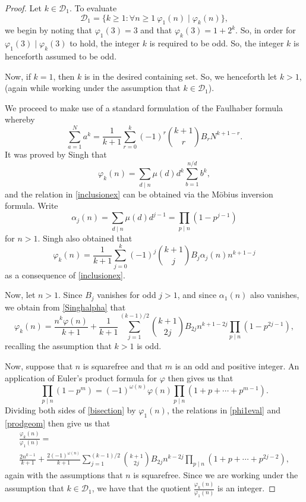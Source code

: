 \documentclass[12pt]{article}
\begin{document}
\begin{proof}
 Let $k \in \mathcal{D}_{1}$. 
 To evaluate
 $$ \mathcal{D}_{1} = \{ k \geq 1 : \forall n \geq 1 \ \varphi_{1}(n) \mid \varphi_k(n) \}, $$ 
 we begin by noting that $\varphi_1(3) = 3$ and that $\varphi_k(3) = 1 + 2^k$. 
 So, in order for $\varphi_1(3) \mid \varphi_k(3)$ to hold, the integer $k$ is required to be odd. 
 So, the integer $k$ is henceforth assumed to be odd. 

 Now, if $k = 1$, then $k$ is in the desired containing set. So, we henceforth let $k > 1$, 
 (again while working under the assumption that $k \in \mathcal{D}_{1}$). 

 We proceed to make use of a standard formulation of the Faulhaber formula whereby 
 $$ \sum_{a=1}^{N} a^{k}
 = \frac{1}{k+1} \sum_{r=0}^{k} (-1)^{r} \binom{k+1}{r} B_{r} N^{k+1-r}. $$
 It was proved by Singh \cite[Theorem 3]{Singh2009} that 
\begin{equation}\label{inclusionex} 
 \varphi_{k}(n) = \sum_{d \mid n} \mu(d) d^{k} \sum_{b=1}^{n/d} b^k, 
\end{equation}
 and the relation in \eqref{inclusionex} can be obtained via the M\"{o}bius inversion formula. 
 Write $$ \alpha_j(n) = \sum_{d \mid n} \mu(d) d^{j-1} = \prod_{p \mid n} (1 - p^{j - 1}) $$
 for $n > 1$. 
 Singh also obtained that 
\begin{equation}\label{Singhalpha} 
 \varphi_{k}(n) = \frac{1}{k+1} \sum_{j = 0}^{k} (-1)^{j} \binom{k+1}{j} B_{j} \alpha_{j}(n) n^{k+1-j} 
\end{equation}
 as a consequence of \eqref{inclusionex}. 

 Now, let $n > 1$. Since $B_{j}$ vanishes for odd $j > 1$, and since $\alpha_1(n)$ also vanishes, 
 we obtain from \eqref{Singhalpha} that 
\begin{equation}\label{bisection}
 \varphi_{k}(n) = \frac{n^k \varphi(n)}{k+1} 
 + \frac{1}{k+1} \sum_{j=1}^{(k-1)/2} \binom{k+1}{2j} B_{2j} n^{k+1-2j} \prod_{p \mid n} (1-p^{2j-1}), 
\end{equation}
 recalling the assumption that $k > 1$ is odd. 

 Now, suppose that $n$ is squarefree and that $m$ is an odd and positive integer. An application of Euler's product formula for $\varphi$ 
 then gives us that 
\begin{equation}\label{prodgeom} 
 \prod_{p \mid n} (1 - p^m) = (-1)^{\omega(n)} \varphi(n) \prod_{p \mid n} (1 + p + \cdots + p^{m-1}). 
\end{equation}
 Dividing both sides of \eqref{bisection} by 
 $\varphi_{1}(n)$, the relations in 
 \eqref{phi1eval} and \eqref{prodgeom} then give us that 
\begin{multline*}
 \frac{\varphi_k(n)}{\varphi_1(n)} 
 = \\ \frac{2n^{k-1}}{k+1} + \frac{2 (-1)^{\omega(n)}}{k+1}
 \sum_{j=1}^{(k-1)/2} \binom{k+1}{2j} B_{2j} n^{k-2j} 
 \prod_{p \mid n} (1 + p + \cdots + p^{2j-2}), 
\end{multline*}
 again with the assumptions that $n$ is squarefree. 
 Since we are working under the assumption that $k \in \mathcal{D}_{1}$, 
 we have that the quotient $ \frac{\varphi_k(n)}{\varphi_1(n)} $ is an integer. 


\end{proof}
\end{document}
